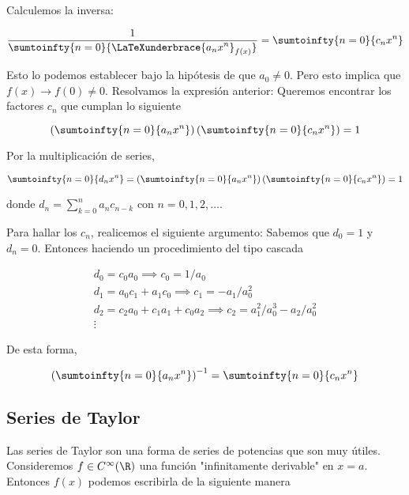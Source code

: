\begin{ejem}
    Calculemos la inversa:
    
    \[
    \frac{1}{\displaystyle \sumtoinfty{n=0}{\LaTeXunderbrace{a_nx^n}_{f(x)}}} = \sumtoinfty{n=0}{c_nx^n}
    \]
    
    Esto lo podemos establecer bajo la hipótesis de que $a_0 \neq 0$. Pero esto implica que $f(x) \rightarrow f(0) \neq 0$. Resolvamos la expresión anterior: Queremos encontrar los factores $c_n$ que cumplan lo siguiente
    
    \[
    \left(\sumtoinfty{n=0}{a_nx^n}\right)\left(\sumtoinfty{n=0}{c_nx^n}\right) = 1
    \]
    
    Por la multiplicación de series,
    
    \[
    \sumtoinfty{n=0}{d_nx^n} = \left(\sumtoinfty{n=0}{a_nx^n}\right)\left(\sumtoinfty{n=0}{c_nx^n}\right) = 1
    \]
    
    \noindent donde $d_n = \sum_{k=0}^n a_nc_{n-k}$ con $n = 0, 1, 2, \dots$.
    
    Para hallar los $c_n$, realicemos el siguiente argumento: Sabemos que $d_0 = 1$ y $d_n = 0$. Entonces haciendo un procedimiento del tipo cascada
    
    \begin{gather*}
        d_0 = c_0a_0 \implies c_0 = 1/a_0 \\
        d_1 = a_0c_1 + a_1c_0 \implies c_1 = -a_1/a_0^2 \\
        d_2 = c_2a_0 + c_1a_1 + c_0a_2 \implies c_2 =  a_1^2/a_0^3 - a_2/a_0^2 \\
        \vdots
    \end{gather*}
    
    De esta forma,
    
    \[
    \left(\sumtoinfty{n=0}{a_nx^n}\right)^{-1} = \sumtoinfty{n=0}{c_nx^n}
    \]
\end{ejem}

\subsection{Series de Taylor}

Las series de Taylor son una forma de series de potencias que son muy útiles. Consideremos $f \in C^{\infty}(\R)$ una función "infinitamente derivable" en $x=a$. Entonces $f(x)$ podemos escribirla de la siguiente manera

